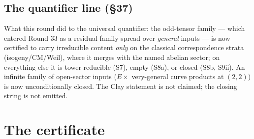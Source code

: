 \documentclass[11pt]{article}
\begin{document}
\subsection*{The quantifier line (\S37)}
What this round did to the universal quantifier: the odd-tensor family
--- which entered Round 33 as a residual family spread over
\emph{general} inputs --- is now certified to carry irreducible content
\emph{only} on the classical correspondence strata (isogeny/CM/Weil),
where it merges with the named abelian sector; on everything else it is
tower-reducible (S7), empty (S8a), or closed (S8b, S9ii). An infinite
family of open-sector inputs ($E\times$ very-general curve products at
$(2,2)$) is now unconditionally closed. The Clay statement is not
claimed; the closing string is not emitted.

\section{The certificate}
\end{document}
